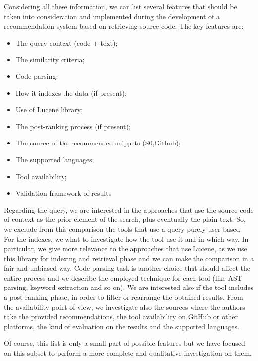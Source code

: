 Considering all these information, we can list several features that should be taken into consideration and implemented during the development of a recommendation system based on retrieving source code. The key features are: 
\begin{itemize}
\item The query context (code + text);
\item  The similarity criteria; %
\item Code parsing;
\item  How it indexes the data (if present);
\item Use of Lucene library;
\item The post-ranking process (if present);
\item The source of the recommended snippets (S0,Github);
\item The supported languages;
\item Tool availability;
\item Validation framework of results

\end{itemize}
Regarding the query, we are interested in the approaches that use the source code of context as the prior element of the search, plus eventually the plain text. So, we exclude from this comparison the tools that use a query purely user-based. For the indexes, we what to investigate how the tool use it and in which way. In particular, we give more relevance to the approaches that use Lucene, as we use this library for indexing and retrieval phase and we can make the comparison in a fair and unbiased way. Code parsing task is another choice that should affect the entire process and we describe the employed technique for each tool (like AST parsing, keyword extraction and so on). We are interested also if the tool includes a post-ranking phase, in order to filter or rearrange the obtained results.   From the availability point of view, we investigate also the sources where the authors take the provided recommendations,  the tool availability on GitHub or other platforms, the kind of evaluation on the results and the supported languages.

Of course, this list is only a small part of possible features but we have focused on this subset to perform a more complete and qualitative investigation on them. 